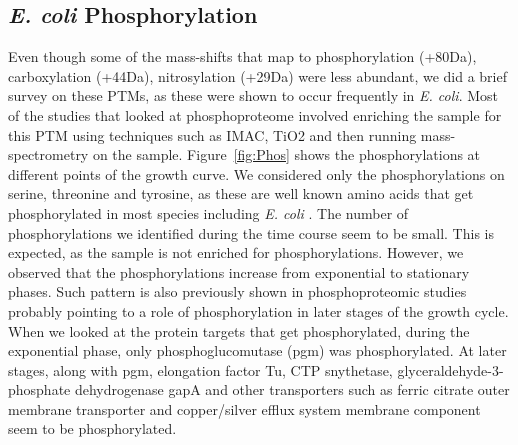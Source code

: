\documentclass[12pt]{article}
\begin{document}


\subsection{\emph{E. coli} Phosphorylation}

Even though some of the mass-shifts that map to phosphorylation (+80Da), carboxylation (+44Da), nitrosylation (+29Da) were less abundant, we did a brief survey on these PTMs, as these were shown to occur frequently in \emph{E. coli}. Most of the studies that looked at phosphoproteome involved enriching the sample for this PTM using techniques such as IMAC, TiO2 and then running mass-spectrometry on the sample. Figure~\ref{fig:Phos} shows the phosphorylations at different points of the growth curve. We considered only the phosphorylations on serine, threonine and tyrosine, as these are well known amino acids that get phosphorylated in most species including \emph{E. coli} \cite{Maceketal2008}. The number of phosphorylations we identified during the time course seem to be small. This is expected, as the sample is not enriched for phosphorylations. However, we observed that the phosphorylations increase from exponential to stationary phases. Such pattern is also previously shown in phosphoproteomic studies \cite{Soaresetal2013} probably pointing to a role of phosphorylation in later stages of the growth cycle. When we looked at the protein targets that get phosphorylated, during the exponential phase, only phosphoglucomutase (pgm) was phosphorylated. At later stages, along with pgm, elongation factor Tu, CTP snythetase, glyceraldehyde-3-phosphate dehydrogenase gapA and other transporters such as ferric citrate outer membrane transporter and copper/silver efflux system membrane component seem to be phosphorylated. 
\end{document}
